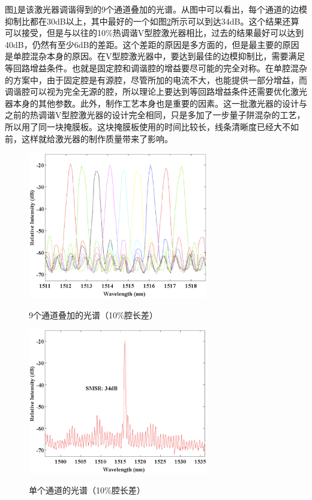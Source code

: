 \documentclass{ZJUthesis}
\begin{document}
图\ref{fig_single_spectra_p10}是该激光器调谐得到的9个通道叠加的光谱。从图中可以看出，每个通道的边模抑制比都在30dB以上，其中最好的一个如图\ref{fig_single_spectrum_p10}所示可以到达34dB。这个结果还算可以接受，但是与以往的10\%热调谐V型腔激光器相比，过去的结果最好可以达到40dB，仍然有至少6dB的差距。这个差距的原因是多方面的，但是最主要的原因是单腔混杂本身的原因。在V型腔激光器中，要达到最佳的边模抑制比，需要满足等回路增益条件。也就是固定腔和调谐腔的增益要尽可能的完全对称。在单腔混杂的方案中，由于固定腔是有源腔，尽管所加的电流不大，也能提供一部分增益，而调谐腔可以视为完全无源的腔，所以理论上要达到等回路增益条件还需要优化激光器本身的其他参数。此外，制作工艺本身也是重要的因素。这一批激光器的设计与之前的热调谐V型腔激光器的设计完全相同，只是多加了一步量子阱混杂的工艺，所以用了同一块掩膜板。这块掩膜板使用的时间比较长，线条清晰度已经大不如前，这样就给激光器的制作质量带来了影响。

\begin{figure}[!ht]
  \centering
  \includegraphics[width=0.7\textwidth]{./Pictures/single_spectra_p10.eps}\\
  \caption{9个通道叠加的光谱（10\%腔长差）}
  \label{fig_single_spectra_p10}
\end{figure}

\begin{figure}[!ht]
  \centering
  \includegraphics[width=0.7\textwidth]{./Pictures/single_spectrum_p10.eps}\\
  \caption{单个通道的光谱（10\%腔长差）}
  \label{fig_single_spectrum_p10}
\end{figure}
\end{document}
